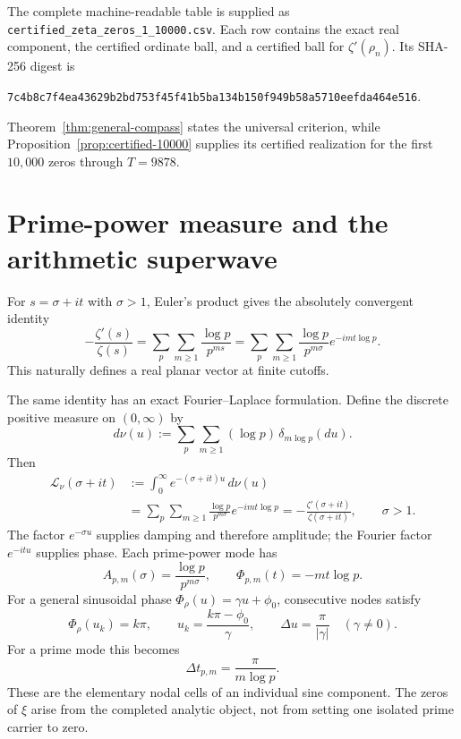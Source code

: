 \documentclass[11pt]{article}
\begin{document}
The complete machine-readable table is supplied as
\texttt{certified\_zeta\_zeros\_1\_10000.csv}.  Each row contains the exact real component,
the certified ordinate ball, and a certified ball for $\zeta'(\rho_n)$.  Its SHA-256 digest is
\begin{center}
\texttt{7c4b8c7f4ea43629b2bd753f45f41b5ba134b150f949b58a5710eefda464e516}.
\end{center}
Theorem~\ref{thm:general-compass} states the universal criterion, while
Proposition~\ref{prop:certified-10000} supplies its certified realization for the first
$10{,}000$ zeros through $T=9878$.

\section{Prime-power measure and the arithmetic superwave}
For $s=\sigma+it$ with $\sigma>1$, Euler's product gives the absolutely convergent
identity \cite{Riemann,Titchmarsh,DLMFdefinition}
\begin{equation}\label{eq:log-derivative}
 -\frac{\zeta'(s)}{\zeta(s)}
 =\sum_{p}\sum_{m\ge1}\frac{\log p}{p^{ms}}
 =\sum_p\sum_{m\ge1}\frac{\log p}{p^{m\sigma}}
   e^{-im t\log p}.
\end{equation}
This naturally defines a real planar vector at finite cutoffs.

The same identity has an exact Fourier--Laplace formulation.  Define the discrete positive
measure on $(0,\infty)$ by
\begin{equation}\label{eq:prime-power-measure}
 d\nu(u):=\sum_p\sum_{m\ge1}(\log p)\,\delta_{m\log p}(du).
\end{equation}
Then
\begin{align}\label{eq:fourier-laplace-superwave}
 \mathcal L_\nu(\sigma+it)
 &:=\int_0^\infty e^{-(\sigma+it)u}\,d\nu(u)\\
 &=\sum_p\sum_{m\ge1}\frac{\log p}{p^{m\sigma}}e^{-imt\log p}
 =-\frac{\zeta'(\sigma+it)}{\zeta(\sigma+it)},\qquad \sigma>1.\nonumber
\end{align}
The factor $e^{-\sigma u}$ supplies damping and therefore amplitude; the Fourier factor
$e^{-itu}$ supplies phase.  Each prime-power mode has
\begin{equation}\label{eq:prime-mode-amplitude-phase}
 A_{p,m}(\sigma)=\frac{\log p}{p^{m\sigma}},\qquad
 \Phi_{p,m}(t)=-mt\log p.
\end{equation}
For a general sinusoidal phase $\Phi_\rho(u)=\gamma u+\phi_0$, consecutive nodes satisfy
\begin{equation}\label{eq:phase-cells}
 \Phi_\rho(u_k)=k\pi,\qquad
 u_k=\frac{k\pi-\phi_0}{\gamma},\qquad
 \Delta u=\frac{\pi}{|\gamma|}\quad(\gamma\ne0).
\end{equation}
For a prime mode this becomes
\begin{equation}\label{eq:prime-phase-cell}
 \Delta t_{p,m}=\frac{\pi}{m\log p}.
\end{equation}
These are the elementary nodal cells of an individual sine component.  The zeros of $\xi$ arise
from the completed analytic object, not from setting one isolated prime carrier to zero.
\end{document}
